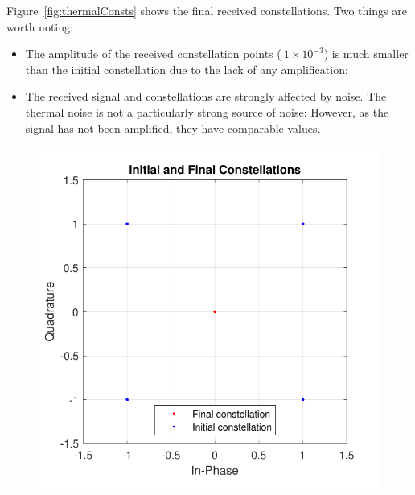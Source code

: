 Figure~\ref{fig:thermalConsts} shows the final received constellations. Two 
things are worth noting:

\begin{itemize}
\item The amplitude of the received constellation points 
($~1\times 10^{-3}$) is much smaller than the initial constellation due to 
the lack of any amplification;
\item The received signal and constellations are strongly affected by noise. 
The thermal noise is not a particularly strong source of noise: However, as the 
signal has not been amplified, they have comparable values.
\end{itemize}


	\begin{figure}[H]
	\centering
		\begin{minipage}{0.45\textwidth}
		\centering
		\includegraphics[width=1\textwidth]
		{sdf/m_qam_system/figures/simulations/02_thermal/constFinal_full.pdf}
		\subcaption{}\label{fig:thermalConstsFull}
	\end{minipage}
	\begin{minipage}{0.45\textwidth}
	\centering

\end{minipage}
\end{figure}
